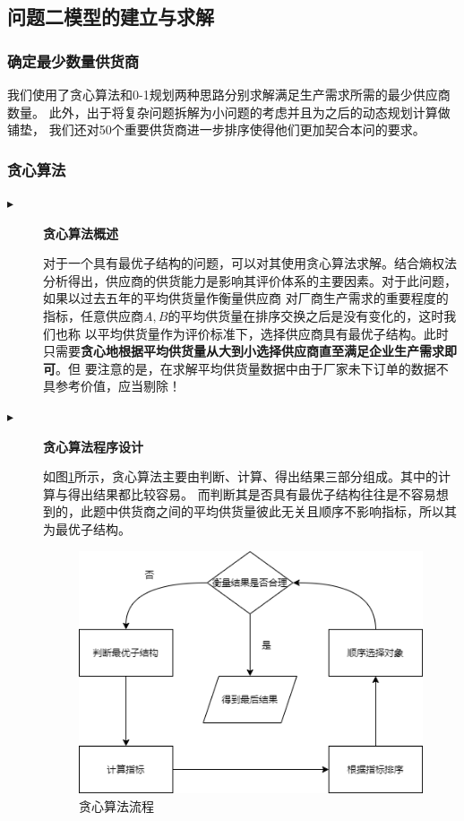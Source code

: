 \documentclass{cumcmthesis}
\begin{document}
\subsection{问题二模型的建立与求解}
\subsubsection{确定最少数量供货商}
我们使用了贪心算法和0-1规划两种思路分别求解满足生产需求所需的最少供应商数量。
此外，出于将复杂问题拆解为小问题的考虑并且为之后的动态规划计算做铺垫，
我们还对50个重要供货商进一步排序使得他们更加契合本问的要求。
\subsubsection*{贪心算法}
\begin{description}
    \item[$\blacktriangleright$] \textbf{贪心算法概述}\par
        对于一个具有最优子结构的问题，可以对其使用贪心算法求解。结合熵权法分析得出，供应商的供货能力是影响其评价体系的主要因素。对于此问题，如果以过去五年的平均供货量作衡量供应商
        对厂商生产需求的重要程度的指标，任意供应商$A,B$的平均供货量在排序交换之后是没有变化的，这时我们也称
        以平均供货量作为评价标准下，选择供应商具有最优子结构。此时只需要\textbf{贪心地根据平均供货量从大到小选择供应商直至满足企业生产需求即可}。但
        要注意的是，在求解平均供货量数据中由于厂家未下订单的数据不具参考价值，应当剔除！
    \item[$\blacktriangleright$] \textbf{贪心算法程序设计}\par
        如图\ref{fig:4}所示，贪心算法主要由判断、计算、得出结果三部分组成。其中的计算与得出结果都比较容易。
        而判断其是否具有最优子结构往往是不容易想到的，此题中供货商之间的平均供货量彼此无关且顺序不影响指标，所以其为最优子结构。
        \begin{figure}[H]
            \centering
            \includegraphics[scale = 0.6]{TX.png}
            \centering
            \caption{贪心算法流程} \label{fig:4}
        \end{figure}
\end{description}
\end{document}

